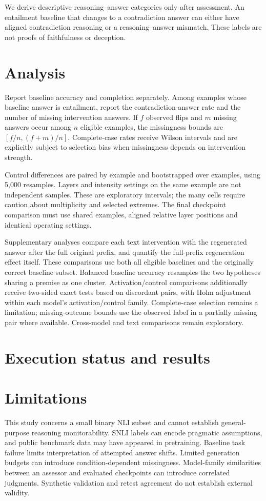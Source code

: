 \documentclass[11pt]{article}
\begin{document}
We derive descriptive reasoning--answer categories only after assessment. An
entailment baseline that changes to a contradiction answer can either have aligned
contradiction reasoning or a reasoning--answer mismatch. These labels are not proofs
of faithfulness or deception.

\section{Analysis}
Report baseline accuracy and completion separately. Among examples whose baseline
answer is entailment, report the contradiction-answer rate and the number of missing
intervention answers. If $f$ observed flips and $m$ missing answers occur among $n$
eligible examples, the missingness bounds are $[f/n,(f+m)/n]$. Complete-case rates
receive Wilson intervals and are explicitly subject to selection bias when missingness
depends on intervention strength.

Control differences are paired by example and bootstrapped over examples, using
5,000 resamples. Layers and intensity settings on the same example are not independent
samples. These are exploratory intervals; the many cells require caution about
multiplicity and selected extremes. The final checkpoint comparison must use shared
examples, aligned relative layer positions and identical operating settings.

Supplementary analyses compare each text intervention with the regenerated answer
after the full original prefix, and quantify the full-prefix regeneration effect
itself. These comparisons use both all eligible baselines and the originally correct
baseline subset. Balanced baseline accuracy resamples the two hypotheses sharing
a premise as one cluster. Activation/control comparisons additionally receive
two-sided exact tests based on discordant pairs, with Holm adjustment within each
model's activation/control family. Complete-case selection remains a limitation;
missing-outcome bounds use the observed label in a partially missing pair where
available. Cross-model and text comparisons remain exploratory.

\section{Execution status and results}


\section{Limitations}
This study concerns a small binary NLI subset and cannot establish general-purpose
reasoning monitorability. SNLI labels can encode pragmatic assumptions, and public
benchmark data may have appeared in pretraining. Baseline task failure limits
interpretation of attempted answer shifts. Limited generation budgets can introduce
condition-dependent missingness. Model-family similarities between an assessor and
evaluated checkpoints can introduce correlated judgments. Synthetic validation and
retest agreement do not establish external validity.
\end{document}
